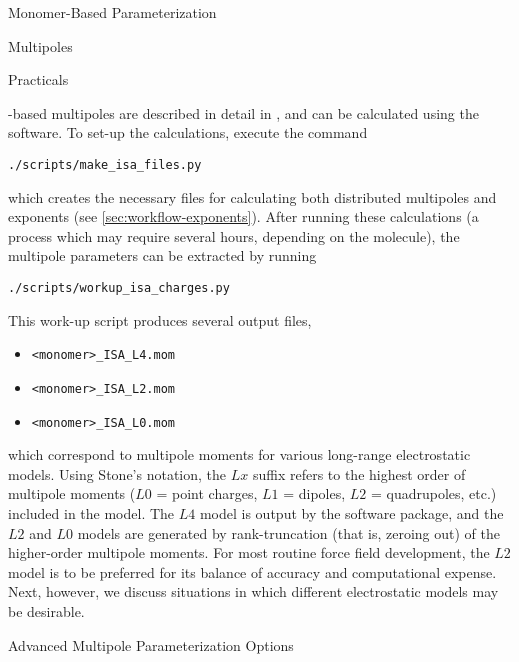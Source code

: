 \begin{section}{Monomer-Based Parameterization}
\begin{subsection}{Multipoles}
\begin{subsubsection}{Practicals}

\isa-based multipoles are described in detail in , and can
be calculated using the \camcasp software. To set-up the \isa calculations,
execute the command
%
\begin{lstlisting}
./scripts/make_isa_files.py
\end{lstlisting}
%
which creates the necessary \isa files for calculating both distributed
multipoles and exponents (see \cref{sec:workflow-exponents}). After running
these calculations (a process which may require several hours, depending on
the molecule), the multipole parameters can be extracted by running
%
\begin{lstlisting}
./scripts/workup_isa_charges.py
\end{lstlisting}
%
This work-up script produces several output files,
\begin{itemize}[noitemsep,label=]
\item \verb|<monomer>_ISA_L4.mom|
\item \verb|<monomer>_ISA_L2.mom|
\item \verb|<monomer>_ISA_L0.mom|
\end{itemize}
which correspond to multipole moments for various long-range electrostatic
models. Using Stone's notation,\cite{stone2013theory} the $Lx$ suffix refers
to the highest order of multipole moments ($L0$ = point charges, $L1$ =
dipoles, $L2$ = quadrupoles, etc.) included in the model. The $L4$ model is
output by the \camcasp software package, and the $L2$ and $L0$ models are
generated by rank-truncation (that is, zeroing out) of the higher-order multipole
moments. 
For most routine
force field development, the $L2$ model is to be preferred for its balance of
accuracy and computational expense. Next, however, we
discuss situations in which different electrostatic models may be desirable.

\end{subsubsection}
\begin{subsubsection}{Advanced Multipole Parameterization Options}


\end{subsubsection}
\end{subsection}
\end{section}
